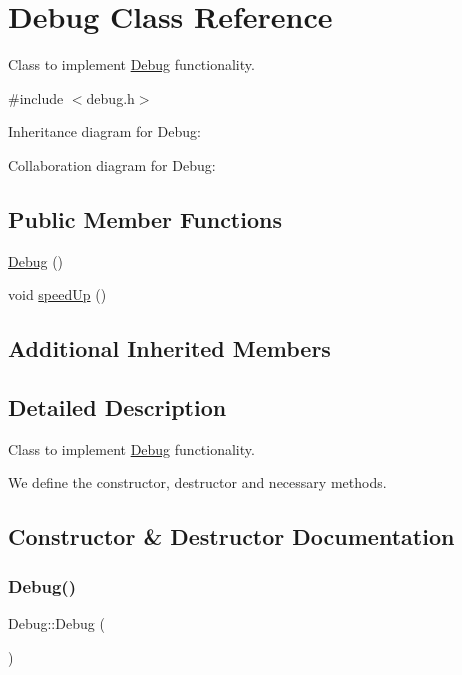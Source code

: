 \hypertarget{classDebug}{}\section{Debug Class Reference}
\label{classDebug}


Class to implement \hyperlink{classDebug}{Debug} functionality.  




{\ttfamily \#include $<$debug.\+h$>$}



Inheritance diagram for Debug\+:


Collaboration diagram for Debug\+:
\subsection*{Public Member Functions}
\begin{DoxyCompactItemize}
\item 
\hyperlink{classDebug_a5b453c195c4cfffed2702c3330f53a64}{Debug} ()
\item 
void \hyperlink{classDebug_a4c42705f755444daa2a22b000a561e01}{speed\+Up} ()
\end{DoxyCompactItemize}
\subsection*{Additional Inherited Members}


\subsection{Detailed Description}
Class to implement \hyperlink{classDebug}{Debug} functionality. 

We define the constructor, destructor and necessary methods. 

\subsection{Constructor \& Destructor Documentation}
\mbox{\label{classDebug_a5b453c195c4cfffed2702c3330f53a64}} 
\subsubsection{\texorpdfstring{Debug()}{Debug()}}
{\footnotesize\ttfamily Debug\+::\+Debug (\begin{DoxyParamCaption}{ }\end{DoxyParamCaption})}

